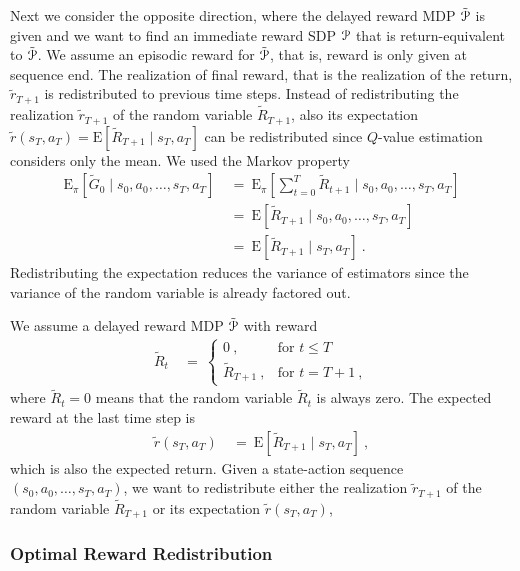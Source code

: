\documentclass{article}
\newcommand\EXP{\mathbf{\mathrm{E}}}
\renewcommand{\leq}{\leqslant}
\begin{document}
\begin{appendices}
Next we consider the opposite direction, where the delayed reward
MDP $\tilde{\mathcal{P}}$ is given and we want to find an immediate reward
SDP $\mathcal{P}$ that is return-equivalent to $\tilde{\mathcal{P}}$.
We assume an episodic reward for $\tilde{\mathcal{P}}$, that is, 
reward is only given at sequence end.
The realization of final reward, that is the realization of the return,
$\tilde{r}_{T+1}$ is redistributed 
to previous time steps.
Instead of redistributing the realization $\tilde{r}_{T+1}$ 
of the random variable $\tilde{R}_{T+1}$, also its expectation
$\tilde{r}(s_T,a_T)=\EXP \left[ \tilde{R}_{T+1} \mid s_T,a_T \right]$ 
can be redistributed since $Q$-value estimation 
considers only the mean.  
We used the Markov property 
\begin{align}
  \EXP_{\pi} \left[ \tilde{G}_0 \mid s_0,a_0,\ldots,s_T,a_T \right] \ &= \
  \EXP_{\pi} \left[ \sum_{t=0}^{T} \tilde{R}_{t+1} \mid s_0,a_0,\ldots,s_T,a_T \right] \\ \nonumber
  &= \
  \EXP \left[ \tilde{R}_{T+1} \mid s_0,a_0,\ldots,s_T,a_T \right] \\ \nonumber
  &= \
  \EXP \left[ \tilde{R}_{T+1} \mid s_T,a_T \right] \ .
\end{align}
Redistributing the expectation reduces the variance of estimators since
the variance of the random variable is already factored out.

We assume a delayed reward MDP $\tilde{\mathcal{P}}$ with reward
\begin{align}
  \tilde{R}_t  \ &= \
  \begin{cases}
    0 \ , & \text{for } t \leq T  \\
    \tilde{R}_{T+1} \ , & \text{for } t = T+1 \ ,
  \end{cases} 
\end{align}
where $\tilde{R}_t=0$ means that the random variable $\tilde{R}_t$ is always zero.
The expected reward at the last time step is
\begin{align}
 \tilde{r}(s_T,a_T) \ &= \ \EXP\left[\tilde{R}_{T+1} \mid s_T,a_T\right] \ ,
\end{align}
which is also the expected return.
Given a state-action sequence $(s_0,a_0,\ldots,s_T,a_T)$,
we want to redistribute either the realization $\tilde{r}_{T+1}$ of the
random variable $\tilde{R}_{T+1}$ or its expectation $\tilde{r}(s_T,a_T)$, 



\subsubsection{Optimal Reward Redistribution}
\label{sec:Aopt_rew_red}


\end{appendices}
\end{document}
